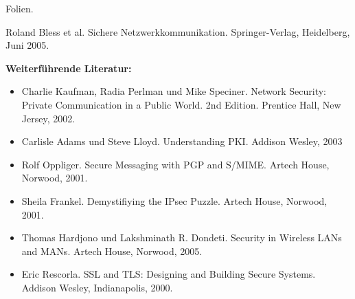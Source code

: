 \begin{course}
\begin{content}
\end{content}

\begin{media}Folien.

\end{media}

\begin{literature}Roland Bless et al. Sichere Netzwerkkommunikation. Springer-Verlag, Heidelberg, Juni 2005.

 

\textbf{Weiterführende Literatur:}

 \begin{itemize}\item Charlie Kaufman, Radia Perlman und Mike Speciner. Network Security: Private Communication in a Public World. 2nd Edition. Prentice Hall, New Jersey, 2002.  \item Carlisle Adams und Steve Lloyd. Understanding PKI. Addison Wesley, 2003  \item Rolf Oppliger. Secure Messaging with PGP and S/MIME. Artech House, Norwood, 2001.  \item Sheila Frankel. Demystifiying the IPsec Puzzle. Artech House, Norwood, 2001.  \item Thomas Hardjono und Lakshminath R. Dondeti. Security in Wireless LANs and MANs. Artech House, Norwood, 2005.  \item Eric Rescorla. SSL and TLS: Designing and Building Secure Systems. Addison Wesley, Indianapolis, 2000.  \end{itemize}\end{literature}



\end{course}